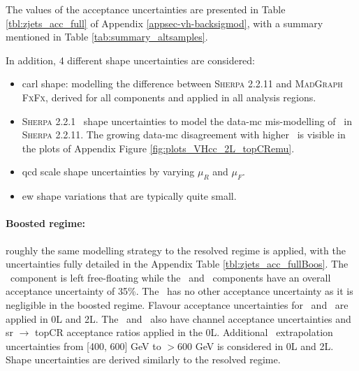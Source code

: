 The values of the acceptance uncertainties are presented in Table \ref{tbl:zjets_acc_full} of Appendix \ref{appsec-vh-backsigmod}, with a summary mentioned in Table \ref{tab:summary_altsamples}.

In addition, 4 different shape uncertainties are considered:
\begin{itemize}
    \item \gls{carl} shape: modelling the difference between \textsc{Sherpa} 2.2.11 and \textsc{MadGraph FxFx}, derived for all components and applied in all analysis regions.
    \item \textsc{Sherpa} 2.2.1 \ptv\ shape uncertainties to model the data-\gls{mc} mis-modelling of \ptv\ in \textsc{Sherpa} 2.2.11. The growing data-\gls{mc} disagreement with higher \ptv\ is visible in the plots of Appendix Figure \ref{fig:plots_VHcc_2L_topCRemu}.
    \item \gls{qcd} scale shape uncertainties by varying $\mu_R$ and $\mu_F$.
    \item \gls{ew} shape variations that are typically quite small.
\end{itemize} 

\paragraph{Boosted regime:} roughly the same modelling strategy to the resolved regime is applied, with the uncertainties fully detailed in the Appendix Table \ref{tbl:zjets_acc_fullBoos}. The \zhf\ component is left free-floating while the \zmf\ and \zlf\ components have an overall acceptance uncertainty of 35\%. The \zlf\ has no other acceptance uncertainty as it is negligible in the boosted regime. Flavour acceptance uncertainties for \zhf\ and \zmf\ are applied in 0L and 2L. The \zhf\ and \zmf\ also have channel acceptance uncertainties and \gls{sr} $\rightarrow$ topCR acceptance ratios applied in the 0L. Additional \ptv\ extrapolation uncertainties from [400, 600] GeV to $> 600$ GeV is considered in 0L and 2L. Shape uncertainties are derived similarly to the resolved regime. 

